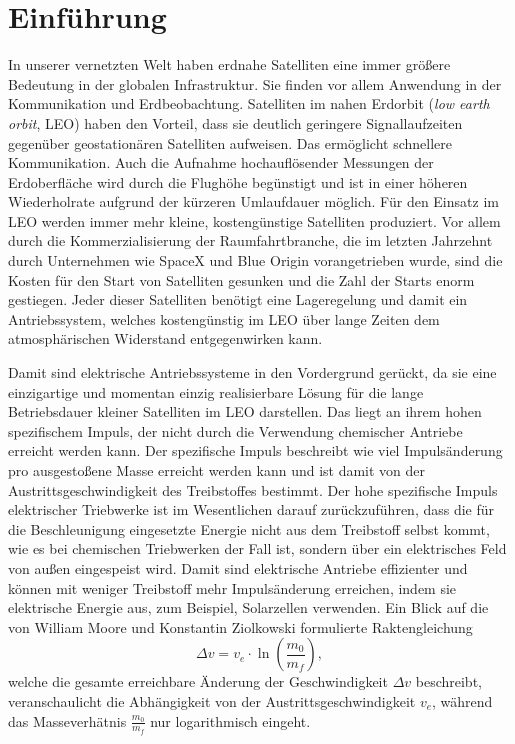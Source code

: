 \chapter{Einführung}
In unserer vernetzten Welt haben erdnahe Satelliten eine immer größere Bedeutung in der globalen Infrastruktur. Sie finden vor allem Anwendung in der Kommunikation und Erdbeobachtung. Satelliten im nahen Erdorbit (\textit{low earth orbit}, LEO) haben den Vorteil, dass sie deutlich geringere Signallaufzeiten gegenüber geostationären Satelliten aufweisen. Das ermöglicht schnellere Kommunikation. Auch die Aufnahme hochauflösender Messungen der Erdoberfläche wird durch die Flughöhe begünstigt und ist in einer höheren Wiederholrate aufgrund der kürzeren Umlaufdauer möglich. Für den Einsatz im LEO werden immer mehr kleine, kostengünstige Satelliten produziert. Vor allem durch die Kommerzialisierung der Raumfahrtbranche, die im letzten Jahrzehnt durch Unternehmen wie SpaceX und Blue Origin vorangetrieben wurde, sind die Kosten für den Start von Satelliten gesunken und die Zahl der Starts enorm gestiegen. Jeder dieser Satelliten benötigt eine Lageregelung und damit ein Antriebssystem, welches kostengünstig im LEO über lange Zeiten dem atmosphärischen Widerstand entgegenwirken kann.

Damit sind elektrische Antriebssysteme in den Vordergrund gerückt, da sie eine einzigartige und momentan einzig realisierbare Lösung für die lange Betriebsdauer kleiner Satelliten im LEO darstellen. Das liegt an ihrem hohen spezifischem Impuls, der nicht durch die Verwendung chemischer Antriebe erreicht werden kann. Der spezifische Impuls beschreibt wie viel Impulsänderung pro ausgestoßene Masse erreicht werden kann und ist damit von der Austrittsgeschwindigkeit des Treibstoffes bestimmt. Der hohe spezifische Impuls elektrischer Triebwerke ist im Wesentlichen darauf zurückzuführen, dass die für die Beschleunigung eingesetzte Energie nicht aus dem Treibstoff selbst kommt, wie es bei chemischen Triebwerken der Fall ist, sondern über ein elektrisches Feld von außen eingespeist wird. Damit sind elektrische Antriebe effizienter und können mit weniger Treibstoff mehr Impulsänderung erreichen, indem sie elektrische Energie aus, zum Beispiel, Solarzellen verwenden. Ein Blick auf die von William Moore und Konstantin Ziolkowski formulierte Raktengleichung
\begin{equation}
    \Delta v = v_e \cdot \ln\left(\frac{m_0}{m_f}\right),
\end{equation}
welche die gesamte erreichbare Änderung der Geschwindigkeit $\Delta v$ beschreibt, veranschaulicht die Abhängigkeit von der Austrittsgeschwindigkeit $v_e$, während das Masseverhätnis $\frac{m_0}{m_f}$ nur logarithmisch eingeht.

